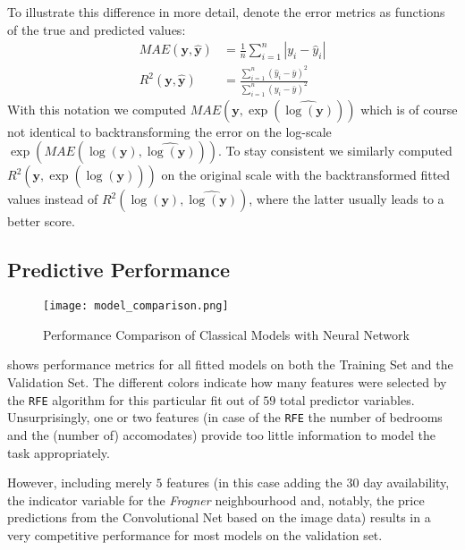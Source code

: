 To illustrate this difference in more detail, denote the error metrics as functions of the true and predicted values:
\begin{align*}
  MAE(\mathbf{y}, \hat{\mathbf{y}})
   & = \frac{1}{n}\sum_{i = 1}^{n} \left| y_i - \hat{y}_i \right|                                               \\
  R^2(\mathbf{y}, \hat{\mathbf{y}})
   & = \frac{\sum_{i=1}^{n} \left( \hat{y}_i - \bar{y}\right)^2}{\sum_{i=1}^{n} \left( y_i - \bar{y} \right)^2}
\end{align*}
With this notation we computed $MAE \left(\mathbf{y}, \exp \left(\widehat{\log(\mathbf{y})}\right)\right)$ which is of course not identical to backtransforming the error on the log-scale $\exp \left(MAE \left(\log(\mathbf{y}), \widehat{\log(\mathbf{y})}\right) \right)$.
To stay consistent we similarly computed $R^2 \left(\mathbf{y}, \exp \left(\widehat{\log(\mathbf{y})}\right)\right)$ on the original scale with the backtransformed fitted values instead of  $R^2 \left(\log(\mathbf{y}), \widehat{\log(\mathbf{y})}\right)$, where the latter usually leads to a better score.



\subsection{Predictive Performance}

\begin{figure}[t]
  \centering
  \texttt{[image: model\_comparison.png]}
  \caption{Performance Comparison of Classical Models with Neural Network}
  \label{fig:model-comparison}
\end{figure}

 shows performance metrics for all fitted models on both the Training Set and the Validation Set.
The different colors indicate how many features were selected by the \texttt{RFE} algorithm for this particular fit out of $59$ total predictor variables.
Unsurprisingly, one or two features (in case of the \texttt{RFE} the number of bedrooms and the (number of) accomodates) provide too little information to model the task appropriately.

However, including merely $5$ features (in this case adding the $30$ day availability, the indicator variable for the \emph{Frogner} neighbourhood and, notably, the price predictions from the Convolutional Net based on the image data) results in a very competitive performance for most models on the validation set.

